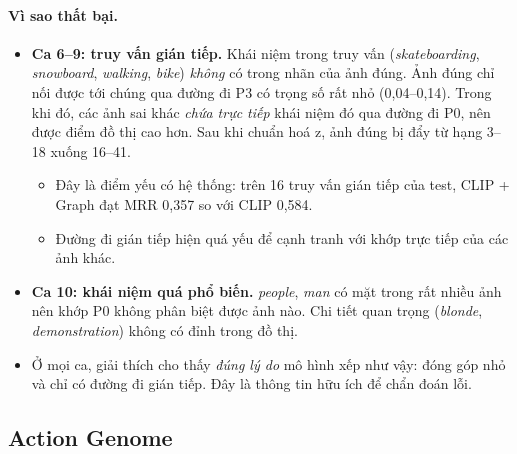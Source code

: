 \documentclass[11pt,a4paper]{article}
\begin{document}
\paragraph{Vì sao thất bại.}
\begin{itemize}
  \item \textbf{Ca 6–9: truy vấn gián tiếp.} Khái niệm trong truy vấn (\textit{skateboarding}, \textit{snowboard}, \textit{walking}, \textit{bike}) \emph{không} có trong nhãn của ảnh đúng. Ảnh đúng chỉ nối được tới chúng qua đường đi P3 có trọng số rất nhỏ (0,04–0,14). Trong khi đó, các ảnh sai khác \emph{chứa trực tiếp} khái niệm đó qua đường đi P0, nên được điểm đồ thị cao hơn. Sau khi chuẩn hoá z, ảnh đúng bị đẩy từ hạng 3–18 xuống 16–41.
  \begin{itemize}
    \item Đây là điểm yếu có hệ thống: trên 16 truy vấn gián tiếp của test, CLIP + Graph đạt MRR 0,357 so với CLIP 0,584.
    \item Đường đi gián tiếp hiện quá yếu để cạnh tranh với khớp trực tiếp của các ảnh khác.
  \end{itemize}
  \item \textbf{Ca 10: khái niệm quá phổ biến.} \textit{people}, \textit{man} có mặt trong rất nhiều ảnh nên khớp P0 không phân biệt được ảnh nào. Chi tiết quan trọng (\textit{blonde}, \textit{demonstration}) không có đỉnh trong đồ thị.
  \item Ở mọi ca, giải thích cho thấy \emph{đúng lý do} mô hình xếp như vậy: đóng góp nhỏ và chỉ có đường đi gián tiếp. Đây là thông tin hữu ích để chẩn đoán lỗi.
\end{itemize}

\subsection{Action Genome}
\end{document}
